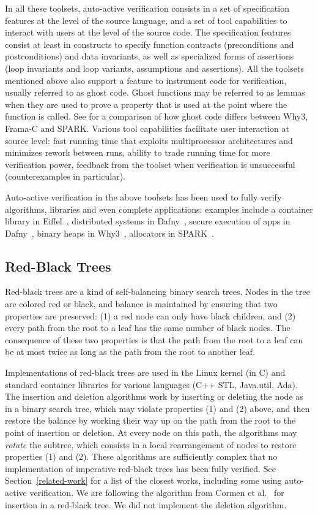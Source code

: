 \documentclass[11pt,a4paper]{article}
\begin{document}
In all these toolsets, auto-active verification consists in a set of
specification features at the level of the source language, and a set of tool
capabilities to interact with users at the level of the source code. The
specification features consist at least in constructs to specify function
contracts (preconditions and postconditions) and data invariants, as well as
specialized forms of assertions (loop invariants and loop variants, assumptions
and assertions). All the toolsets mentioned above also support a feature to
instrument code for verification, usually referred to as ghost code. Ghost
functions may be referred to as lemmas when they are used to prove a property
that is used at the point where the function is called. See
\cite{kosmatov:hal-01344110} for a comparison of how ghost code differs between
Why3, Frama-C and SPARK. Various tool capabilities facilitate user interaction
at source level: fast running time that exploits multiprocessor architectures
and minimizes rework between runs, ability to trade running time for more
verification power, feedback from the toolset when verification is unsuccessful
(counterexamples in particular).

Auto-active verification in the above toolsets has been used to fully verify
algorithms, libraries and even complete applications: examples include a
container library in Eiffel~\cite{Polikarpova2015}, distributed systems in
Dafny~\cite{Hawblitzel2015IronFleet}, secure execution of apps in
Dafny~\cite{Hawblitzel2014Ironclad}, binary heaps in Why3~\cite{tafat11rr},
allocators in SPARK~\cite{Dross2016}.

\subsection{Red-Black Trees}

Red-black trees are a kind of self-balancing binary search trees. Nodes in the
tree are colored red or black, and balance is maintained by ensuring that two
properties are preserved: (1) a red node can only have black children, and (2)
every path from the root to a leaf has the same number of black nodes. The
consequence of these two properties is that the path from the root to a leaf
can be at most twice as long as the path from the root to another leaf.

Implementations of red-black trees are used in the Linux kernel (in C) and
standard container libraries for various languages (C++ STL, Java.util,
Ada). The insertion and deletion algorithms work by inserting or deleting the
node as in a binary search tree, which may violate properties (1) and (2)
above, and then restore the balance by working their way up on the path from
the root to the point of insertion or deletion. At every node on this path, the
algorithms may \emph{rotate} the subtree, which consists in a local
rearrangement of nodes to restore properties (1) and (2). These algorithms are
sufficiently complex that no implementation of imperative red-black trees has
been fully verified. See Section~\ref{related-work} for a list of the closest
works, including some using auto-active verification. We are following the
algorithm from Cormen et al.~\cite{Cormen2009} for insertion in a red-black
tree. We did not implement the deletion algorithm.
\end{document}
